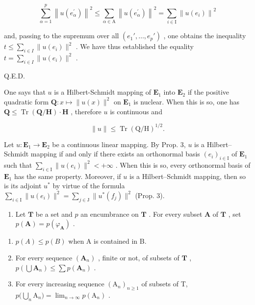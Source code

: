 \[
\sum_ {\alpha = 1} ^ {p} \left\| u (e _ {\alpha} ^ {\prime}) \right\| ^ {2} \leqslant \sum_ {\alpha \in \mathrm{A}} \left\| u (e _ {\alpha} ^ {\prime}) \right\| ^ {2} = \sum_ {i \in \mathrm{I}} \left\| u (e _ {i}) \right\| ^ {2}
\]

and, passing to the supremum over all \((e_1', \ldots, e_p')\) , one obtains the inequality \(t \leqslant \sum_{i \in I} \| u(e_i) \|^2\) . We have thus established the equality \(t = \sum_{i \in I} \| u(e_i) \|^2\) .

Q.E.D.

One says that \(u\) is a Hilbert-Schmidt mapping of \(\mathbf{E}_1\) into \(\mathbf{E}_2\) if the positive quadratic form \(\mathbf{Q}: x \mapsto \| u(x) \|^2\) on \(\mathbf{E}_1\) is nuclear. When this is so, one has \(\mathbf{Q} \leqslant \operatorname{Tr}(\mathbf{Q}/\mathbf{H}) \cdot \mathbf{H}\) , therefore \(u\) is continuous and

\[
\| u \| \leqslant \operatorname{Tr} (\mathrm{Q/H}) ^ {1 / 2}.
\]

Let \(u: \mathbf{E}_1 \to \mathbf{E}_2\) be a continuous linear mapping. By Prop. 3, \(u\) is a Hilbert--Schmidt mapping if and only if there exists an orthonormal basis \((e_i)_{i \in \mathrm{I}}\) of \(\mathbf{E}_1\) such that \(\sum_{i \in \mathrm{I}} \|u(e_i)\|^2 < +\infty\) . When this is so, every orthonormal basis of \(\mathbf{E}_1\) has the same property. Moreover, if \(u\) is a Hilbert--Schmidt mapping, then so is its adjoint \(u^*\) by virtue of the formula \(\sum_{i \in \mathrm{I}} \|u(e_i)\|^2 = \sum_{j \in \mathrm{J}} \|u^*(f_j)\|^2\) (Prop. 3).


\exercisesection{}

\begin{enumerate}
\def\labelenumi{\arabic{enumi})}
\tightlist
\item
  Let \(\mathbf{T}\) be a set and \(p\) an encumbrance on \(\mathbf{T}\) . For every subset \(\mathbf{A}\) of \(\mathbf{T}\) , set \(p(\mathbf{A}) = p(\varphi_{\mathbf{A}})\) .
\end{enumerate}

\begin{enumerate}
\def\labelenumi{\alph{enumi})}
\item
  \(p(A) \leqslant p(B)\) when A is contained in B.
\item
  For every sequence \((\mathbf{A}_n)\) , finite or not, of subsets of \(\mathbf{T}\) , \(p(\bigcup \mathbf{A}_n) \leqslant \sum p(\mathbf{A}_n)\) .
\item
  For every increasing sequence \((\mathrm{A}_n)_{n\geqslant 1}\) of subsets of T, \(p\big(\bigcup_{n}\mathrm{A}_{n}\big) = \lim_{n\to \infty}p(\mathrm{A}_n)\) .
\end{enumerate}

